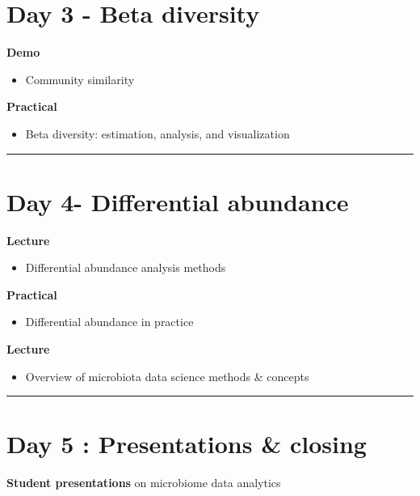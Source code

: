 \documentclass[
  oneside]{book}
\providecommand{\tightlist}{%
  \setlength{\itemsep}{0pt}\setlength{\parskip}{0pt}}
\begin{document}
\hypertarget{day-3---beta-diversity}{%
\section{Day 3 - Beta diversity}\label{day-3---beta-diversity}}

\textbf{Demo}

\begin{itemize}
\tightlist
\item
  Community similarity
\end{itemize}

\textbf{Practical}

\begin{itemize}
\tightlist
\item
  Beta diversity: estimation, analysis, and visualization
\end{itemize}

\begin{center}\rule{0.5\linewidth}{0.5pt}\end{center}

\hypertarget{day-4--differential-abundance}{%
\section{Day 4- Differential abundance}\label{day-4--differential-abundance}}

\textbf{Lecture}

\begin{itemize}
\tightlist
\item
  Differential abundance analysis methods
\end{itemize}

\textbf{Practical}

\begin{itemize}
\tightlist
\item
  Differential abundance in practice
\end{itemize}

\textbf{Lecture}

\begin{itemize}
\tightlist
\item
  Overview of microbiota data science methods \& concepts
\end{itemize}

\begin{center}\rule{0.5\linewidth}{0.5pt}\end{center}

\hypertarget{day-5-presentations-closing}{%
\section{Day 5 : Presentations \& closing}\label{day-5-presentations-closing}}

\textbf{Student presentations} on microbiome data analytics

  
\end{document}
